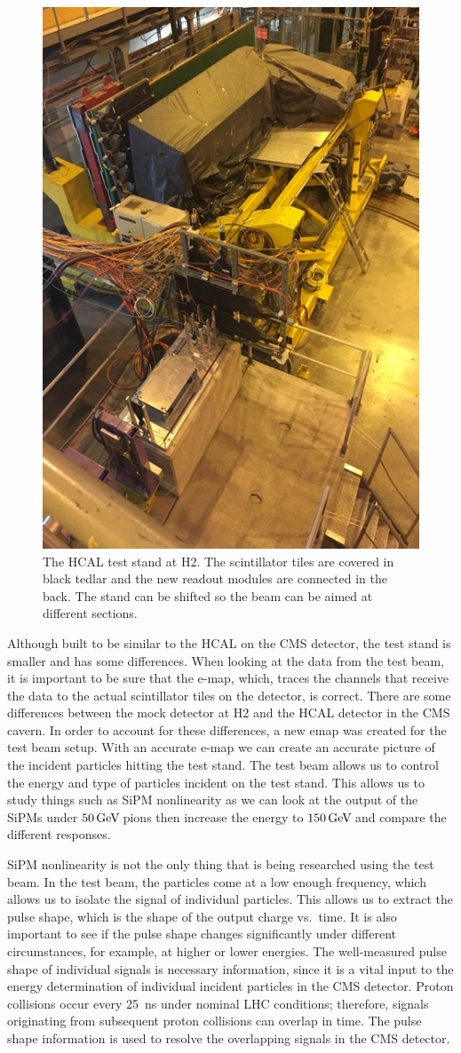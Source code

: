 \begin{figure}
\centering
\includegraphics[width=0.6\linewidth]{Figures/Teststand.png}
\caption{The HCAL test stand at H2. The scintillator tiles are covered in black tedlar and the new readout modules are connected in the back. The stand can be shifted so the beam can be aimed at different sections.}
\label{fig:stand}
\end{figure}

Although built to be similar to the HCAL on the CMS detector, the test stand is smaller and has some differences. When looking at the data from the test beam, it is important to be sure that the e-map, which, traces the channels that receive the data to the actual scintillator tiles on the detector, is correct. There are some differences between the mock detector at H2 and the HCAL detector in the CMS cavern. In order to account for these differences, a new emap was created for the test beam setup. With an accurate e-map we can create an accurate picture of the incident particles hitting the test stand. The test beam allows us to control the energy and type of particles incident on the test stand. This allows us to study things such as SiPM nonlinearity as we can look at the output of the SiPMs under $50 {\,\text{Ge\hspace{-.08em}V\hspace{-0.16em}}}$ pions then increase the energy to $150 {\,\text{Ge\hspace{-.08em}V\hspace{-0.16em}}}$ and compare the different responses. 

SiPM nonlinearity is not the only thing that is being researched using the test beam. In the test beam, the particles come at a low enough frequency, which allows us to isolate the signal of individual particles. This allows us to extract the pulse shape, which is the shape of the output charge vs.\ time. It is also important to see if the pulse shape changes significantly under different circumstances, for example, at higher or lower energies. The well-measured pulse shape of individual signals is necessary information, since it is a vital input to the energy determination of individual incident particles in the CMS detector. Proton collisions occur every 25~ns under nominal LHC conditions; therefore, signals originating from subsequent proton collisions can overlap in time. The pulse shape information is used to resolve the overlapping signals in the CMS detector.

